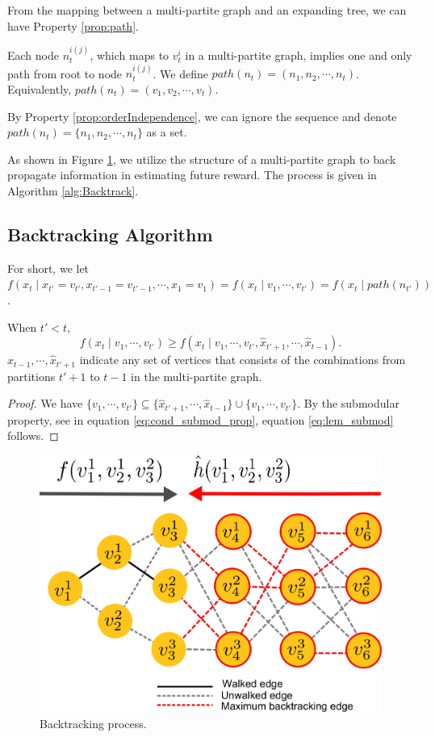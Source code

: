 From the mapping between a multi-partite graph and an expanding tree, we can have Property \ref{prop:path}.

\begin{propty}
\label{prop:path}
Each node $ n_{t}^{i(j)} $, which maps to $ v_{t}^{i} $ in a multi-partite graph, implies one and only path from root to node $ n_{t}^{i(j)} $.
We define $ path(n_{t}) = ( n_{1}, n_{2} , \cdots , n_{t} ) $.
Equivalently, $ path(n_{t}) = ( v_{1}, v_{2} , \cdots , v_{t} ) $.
\end{propty}

By Property \ref{prop:orderIndependence}, we can ignore the sequence and denote $ path(n_{t}) = \{ n_{1}, n_{2} , \cdots , n_{t} \} $ as a set.

As shown in Figure \ref{fig:backtracking}, we utilize the structure of a multi-partite graph to back propagate information in estimating future reward. 
The process is given in Algorithm \ref{alg:Backtrack}.

\subsection{Backtracking Algorithm}
\label{subsec:backtrack_algorithm}

For short, we let $ f(x_{t} \mid x_{t'}=v_{t'}, x_{t'-1} = v_{t'-1} , \cdots  , x_{1} = v_{1} ) = f(x_{t} \mid v_{1}, \cdots , v_{t'}) = f(x_{t} \mid path(n_{t'})) $. 

\begin{lem}
\label{lem:submod}
When $ t' < t $, 
\begin{equation}
\label{eq:lem_submod}
f(x_{t} \mid v_{1} , \cdots , v_{t'} ) \geq f(x_{t} \mid v_{1} , \cdots , v_{t'} , \hat{x}_{t'+1} , \cdots , \hat{x}_{t-1}  ). 
\end{equation}
$ \hat{x}_{t-1} , \cdots , \hat{x}_{t'+1} $ indicate any set of vertices that consists of the combinations from partitions $ t'+1 $ to $ t - 1 $ in the multi-partite graph.
\begin{proof}
We have $ \{ v_{1} , \cdots , v_{t'} \} \subseteq \{ \hat{x}_{t'+1} , \cdots , \hat{x}_{t-1} \} \cup \{ v_{1} , \cdots , v_{t'} \} $.
By the submodular property, see in equation \eqref{eq:cond_submod_prop}, equation \eqref{eq:lem_submod} follows. 
\end{proof}
\end{lem}

\begin{figure}
\centering
\includegraphics[width=0.5\linewidth]{./images/backtracking.pdf}
\caption{Backtracking process.}
\label{fig:backtracking}
\end{figure}

